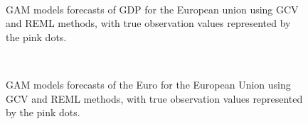 \documentclass[11pt,regno]{amsart}
\theoremstyle{plain}
\numberwithin{equation}{section}
\begin{document}
\begin{figure}
\centering
\centerline{ \mbox{
  \quad
{}
}}
\caption{GAM models forecasts of GDP for the European union using GCV and REML methods, with true observation values represented by the pink dots.  }
\end{figure}

\begin{figure}
\centering
\centerline{ \mbox{
  \quad
{}
}}
\caption{GAM models forecasts of the Euro for the European Union using GCV and REML methods, with true observation values represented by the pink dots.  }
\end{figure}
\end{document}
